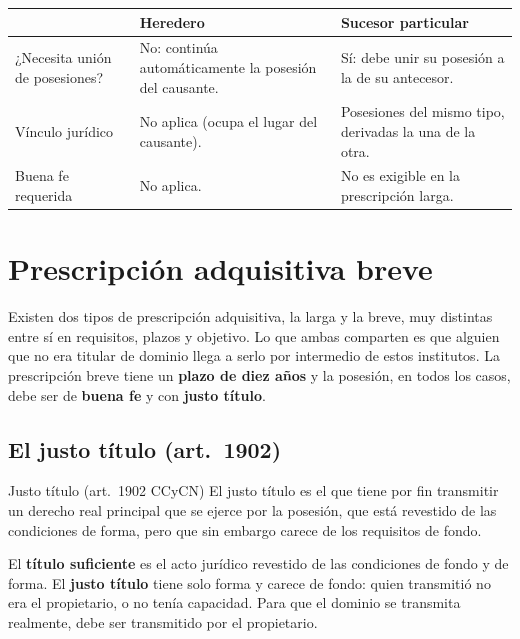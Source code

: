 \documentclass[12pt,oneside]{book}
\begin{document}
\begin{table}[H]
\centering
\begin{tabularx}{\textwidth}{@{}>{\raggedright\arraybackslash}p{}>{\raggedright\arraybackslash}X>{\raggedright\arraybackslash}X@{}}
\toprule
 & \textbf{Heredero} & \textbf{Sucesor particular} \\
\midrule
¿Necesita unión de posesiones? & No: continúa automáticamente la posesión del causante. & Sí: debe unir su posesión a la de su antecesor. \\
Vínculo jurídico & No aplica (ocupa el lugar del causante). & Posesiones del mismo tipo, derivadas la una de la otra. \\
Buena fe requerida & No aplica. & No es exigible en la prescripción larga. \\
\bottomrule
\end{tabularx}
\end{table}

\section{Prescripción adquisitiva breve}

Existen dos tipos de prescripción adquisitiva, la larga y la breve, muy distintas entre sí en requisitos, plazos y objetivo. Lo que ambas comparten es que alguien que no era titular de dominio llega a serlo por intermedio de estos institutos. La prescripción breve tiene un \textbf{plazo de diez años} y la posesión, en todos los casos, debe ser de \textbf{buena fe} y con \textbf{justo título}.


\subsection{El justo título (art.~1902)}

\begin{definition}{Justo título (art.~1902 CCyCN)}
El justo título es el que tiene por fin transmitir un derecho real principal que se ejerce por la posesión, que está revestido de las condiciones de forma, pero que sin embargo carece de los requisitos de fondo.
\end{definition}

El \textbf{título suficiente} es el acto jurídico revestido de las condiciones de fondo y de forma. El \textbf{justo título} tiene solo forma y carece de fondo: quien transmitió no era el propietario, o no tenía capacidad. Para que el dominio se transmita realmente, debe ser transmitido por el propietario.
\end{document}
